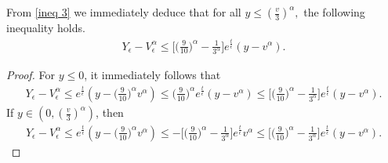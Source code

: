 \documentclass[11pt]{article}
\numberwithin{equation}{section}
\begin{document}
  \begin{rmk}\label{remark v alpha y}
     From \eqref{ineq 3} we immediately deduce that
   for all $y\leq (\frac{v}{3})^{\alpha},$ the following inequality holds.  \begin{align*}
         Y_{\epsilon}-V_{\epsilon}^{\alpha}\leq \bigg[\Big(\frac{9}{10}\Big)^{\alpha}-\frac{1}{3^{\alpha}}\bigg]e^{\frac{t}{\epsilon}}(y-v^{\alpha}).
     \end{align*}
  \end{rmk}
  \begin{proof}
      For $y\leq 0 $, it immediately follows that
      \begin{align*}
          Y_{\epsilon}-V_{\epsilon}^{\alpha}\leq e^{\frac{t}{\epsilon}} (y-\Big(\frac{9}{10}\Big)^{\alpha}v^{\alpha})\leq\Big(\frac{9}{10}\Big)^{\alpha} e^{\frac{t}{\epsilon}} (y-v^{\alpha})\leq  \bigg[\Big(\frac{9}{10}\Big)^{\alpha}-\frac{1}{3^{\alpha}}\bigg]e^{\frac{t}{\epsilon}}(y-v^{\alpha}).
      \end{align*}
      If $y\in(0,(\frac{v}{3})^{\alpha})$, then
       \begin{align*}
          Y_{\epsilon}-V_{\epsilon}^{\alpha}\leq e^{\frac{t}{\epsilon}} (y-\Big(\frac{9}{10}\Big)^{\alpha}v^{\alpha})\leq -\bigg[\Big(\frac{9}{10}\Big)^{\alpha}-\frac{1}{3^{\alpha}}\bigg] e^{\frac{t}{\epsilon}} v^{\alpha} \leq \bigg[\Big(\frac{9}{10}\Big)^{\alpha}-\frac{1}{3^{\alpha}}\bigg] e^{\frac{t}{\epsilon}} (y-v^{\alpha}).
          \end{align*}
  \end{proof}
\end{document}
